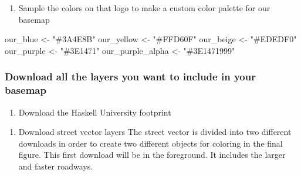 \documentclass[
  paper=a4,
  ,captions=tableheading
]{scrartcl}
\newenvironment{Shaded}{\begin{snugshade}}{\end{snugshade}}
\newcommand{\AttributeTok}[1]{\textcolor[rgb]{0.77,0.63,0.00}{#1}}
\newcommand{\DecValTok}[1]{\textcolor[rgb]{0.00,0.00,0.81}{#1}}
\newcommand{\FunctionTok}[1]{\textcolor[rgb]{0.00,0.00,0.00}{#1}}
\newcommand{\NormalTok}[1]{#1}
\newcommand{\OtherTok}[1]{\textcolor[rgb]{0.56,0.35,0.01}{#1}}
\newcommand{\SpecialCharTok}[1]{\textcolor[rgb]{0.00,0.00,0.00}{#1}}
\newcommand{\StringTok}[1]{\textcolor[rgb]{0.31,0.60,0.02}{#1}}
\providecommand{\tightlist}{%
  \setlength{\itemsep}{0pt}\setlength{\parskip}{0pt}}
\begin{document}
\begin{enumerate}
\def\labelenumi{\arabic{enumi}.}
\setcounter{enumi}{1}
\tightlist
\item
  Sample the colors on that logo to make a custom color palette for our
  basemap
\end{enumerate}

\begin{Shaded}
\begin{Highlighting}[]
\NormalTok{our\_blue }\OtherTok{\textless{}{-}} \StringTok{"\#3A4E8B"}
\NormalTok{our\_yellow }\OtherTok{\textless{}{-}} \StringTok{"\#FFD60F"}
\NormalTok{our\_beige }\OtherTok{\textless{}{-}} \StringTok{"\#EDEDF0"}
\NormalTok{our\_purple }\OtherTok{\textless{}{-}} \StringTok{"\#3E1471"}
\NormalTok{our\_purple\_alpha }\OtherTok{\textless{}{-}} \StringTok{"\#3E1471999"}
\end{Highlighting}
\end{Shaded}

\hypertarget{download-all-the-layers-you-want-to-include-in-your-basemap}{%
\subsubsection{Download all the layers you want to include in your
basemap}\label{download-all-the-layers-you-want-to-include-in-your-basemap}}

\begin{enumerate}
\def\labelenumi{\arabic{enumi}.}
\tightlist
\item
  Download the Haskell University footprint
\end{enumerate}

\begin{Shaded}
\end{Shaded}

\begin{enumerate}
\def\labelenumi{\arabic{enumi}.}
\setcounter{enumi}{1}
\tightlist
\item
  Download street vector layers The street vector is divided into two
  different downloads in order to create two different objects for
  coloring in the final figure. This first download will be in the
  foreground. It includes the larger and faster roadways.
\end{enumerate}
\end{document}

